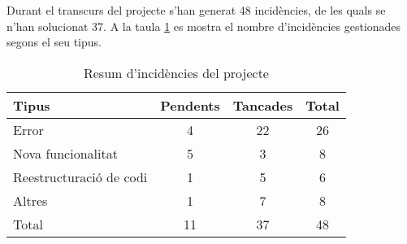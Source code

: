 Durant el transcurs del projecte s'han generat 48 incidències, de les quals se n'han solucionat 37. A la taula \ref{t:resum-incidencies} es mostra el nombre d'incidències gestionades segons el seu tipus.

\begin{table}[htbp]\begin{center}\begin{tabular}{|l|c|c|c|}
\hline
\textbf{Tipus} & \textbf{Pendents} & \textbf{Tancades} & \textbf{Total} \\ \hline
Error & 4 & 22 & 26 \\ \hline
Nova  funcionalitat & 5 & 3 & 8 \\ \hline
Reestructuració de codi & 1 & 5 & 6 \\ \hline
Altres & 1 & 7 & 8 \\ \hline
Total & 11 & 37 & 48 \\ \hline
\end{tabular}\end{center}
\caption{Resum d'incidències del projecte}\label{t:resum-incidencies}
\end{table} 

